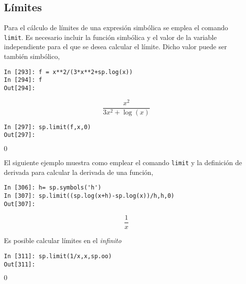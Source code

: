\begin{paracol}{2}
\subsection{Límites} 
Para el cálculo de límites de una expresión simbólica se emplea el comando \texttt{limit}. Es necesario incluir la función simbólica y el valor de la variable independiente para el que se desea calcular el límite.  Dicho valor puede ser también simbólico,
\end{paracol}

\begin{center}
	\begin{minipage}{.3\textwidth}
		\begin{verbatim}
In [293]: f = x**2/(3*x**2+sp.log(x))
In [294]: f
Out[294]:	
		\end{verbatim}
\begin{equation*}
\frac{x^2}{3x^2+\log(x)}	
\end{equation*}

\begin{verbatim}
In [297]: sp.limit(f,x,0)
Out[297]: 
		\end{verbatim}
		$0$
	\end{minipage}
\end{center}
El siguiente ejemplo muestra como emplear el comando \texttt{limit} y la definición de derivada para calcular la derivada de una función,

\begin{center}
	\begin{minipage}{.5\textwidth}
		\begin{verbatim}
In [306]: h= sp.symbols('h')
In [307]: sp.limit((sp.log(x+h)-sp.log(x))/h,h,0)
Out[307]: 
		\end{verbatim}
		{\noindent \begin{equation*}
			\frac{1}{x}	
		\end{equation*}}
		\end{minipage}
\end{center}

Es posible calcular límites en el \emph{infinito}
\begin{center}
	\begin{minipage}{.8\textwidth}
		\begin{verbatim}
In [311]: sp.limit(1/x,x,sp.oo)
Out[311]:
		\end{verbatim}
		$0$
	\end{minipage}
\end{center}

